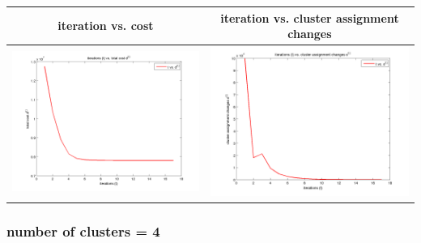 \documentclass[fleqn]{article}
\begin{document}
\begin{center}
  \begin{longtable}{ c | c }
	\multicolumn{1}{c}{iteration vs. cost} & 
	\multicolumn{1}{c}{iteration vs. cluster assignment changes}  \\
    \hline
    \includegraphics[scale=0.4]{./pics/task1and2/rio_k=2_random/t_vs_d_random_2_rio.png}  & \includegraphics[scale=0.4]{./pics/task1and2/rio_k=2_random/t_vs_s_random_2_rio.png} \\
    \hline
  \end{longtable}
\end{center}

\subsubsection{number of clusters = 4}
\end{document}
